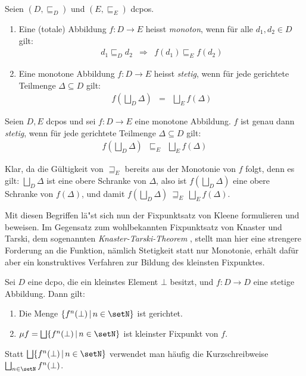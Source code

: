 \begin{definition} \label{definition:math:Monotonie_und_Stetigkeit}
  Seien $(D,\sqsubseteq_D)$ und $(E,\sqsubseteq_E)$ dcpos.
  \begin{enumerate}
    \item Eine (totale) Abbildung $f: D \to E$ heisst {\em monoton}, wenn f\"ur alle $d_1,d_2\in{D}$ gilt:
          \[\begin{array}{rcl}
            d_1 \sqsubseteq_D d_2 & \Rightarrow & f(d_1) \sqsubseteq_E f(d_2)
          \end{array}\]
    \item Eine monotone Abbildung $f: D \to E$ heisst {\em stetig}, wenn f\"ur jede gerichtete Teilmenge
          $\Delta\subseteq{D}$ gilt:
          \[\begin{array}{rcl}
            f(\bigsqcup_D \Delta) & = & \bigsqcup_E f(\Delta)
          \end{array}\]
  \end{enumerate}
\end{definition}

\begin{korollar}
  Seien $D,E$ dcpos und sei $f: D \to E$ eine monotone Abbildung. $f$ ist genau dann {\em stetig}, wenn
  f\"ur jede gerichtete Teilmenge $\Delta\subseteq{D}$ gilt:
  \[\begin{array}{rcl}
    f(\bigsqcup_D \Delta) & \sqsubseteq_E & \bigsqcup_E f(\Delta)
  \end{array}\]
\end{korollar}

\begin{beweis}
  Klar, da die G\"ultigkeit von $\sqsupseteq_E$ bereits aus der Monotonie von $f$ folgt, denn es gilt:
  $\bigsqcup_D \Delta$ ist eine obere Schranke von $\Delta$, also ist $f(\bigsqcup_D \Delta)$ eine obere
  Schranke von $f(\Delta)$, und damit $f(\bigsqcup_D \Delta)\ \sqsupseteq_E\ \bigsqcup_E f(\Delta)$.
\end{beweis}

Mit diesen Begriffen l\"a"st sich nun der Fixpunktsatz von Kleene formulieren und beweisen. Im Gegensatz zum
wohlbekannten Fixpunktsatz von Knaster und Tarski, dem sogenannten {\em Knaster-Tarski-Theorem} \cite{Tarski55},
stellt man hier eine strengere Forderung an die Funktion, n\"amlich Stetigkeit statt nur Monotonie, erh\"alt
daf\"ur aber ein konstruktives Verfahren zur Bildung des kleinsten Fixpunktes.

\begin{satz} \label{satz:math:Fixpunktsatz_von_Kleene}
  Sei $D$ eine dcpo, die ein kleinstes Element $\bot$ besitzt, und $f: D \to D$ eine stetige Abbildung.
  Dann gilt:
  \begin{enumerate}
    \item Die Menge $\{f^n(\bot)\,|\,n\in\setN\}$ ist gerichtet.
    \item $\mu f = \bigsqcup \{f^n(\bot)\,|\,n\in\setN\}$ ist kleinster Fixpunkt von $f$.
  \end{enumerate}
\end{satz}
%
Statt $\bigsqcup \{f^n(\bot)\,|\,n\in\setN\}$ verwendet man h\"aufig die Kurzschreibweise
$\bigsqcup_{n\in\setN} f^n(\bot)$.

